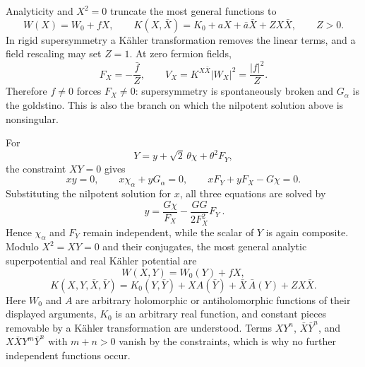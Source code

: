\begin{enumerate}
  Analyticity and \(X^2=0\) truncate the most general functions to
  \[
    W(X)=W_0+fX,
    \qquad
    K(X,\bar X)=K_0+aX+\bar a\bar X+Z X\bar X,
    \qquad Z>0.
  \]
  In rigid supersymmetry a K\"ahler transformation removes the linear terms,
  and a field rescaling may set \(Z=1\).  At zero fermion fields,
  \[
    F_X=-\frac{\bar f}{Z},
    \qquad
    V_X=K^{X\bar X}|W_X|^2=\frac{|f|^2}{Z}.
  \]
  Therefore \(f\ne0\) forces \(F_X\ne0\): supersymmetry is spontaneously
  broken and \(G_\alpha\) is the goldstino.  This is also the branch on which
  the nilpotent solution above is nonsingular.

  For
  \[
    Y=y+\sqrt2\,\theta\chi+\theta^2F_Y,
  \]
  the constraint \(XY=0\) gives
  \[
    xy=0,\qquad x\chi_\alpha+yG_\alpha=0,
    \qquad xF_Y+yF_X-G\chi=0.
  \]
  Substituting the nilpotent solution for \(x\), all three equations are
  solved by
  \[
    \boxed{\ y=\frac{G\chi}{F_X}
      -\frac{GG}{2F_X^2}F_Y\ }.
  \]
  Hence \(\chi_\alpha\) and \(F_Y\) remain independent, while the scalar of
  \(Y\) is again composite.  Modulo \(X^2=XY=0\) and their conjugates, the
  most general analytic superpotential and real K\"ahler potential are
  \[
    W(X,Y)=W_0(Y)+fX,
  \]
  \[
    K(X,Y,\bar X,\bar Y)
      =K_0(Y,\bar Y)+X A(\bar Y)+\bar X\,\bar A(Y)+Z X\bar X.
  \]
  Here \(W_0\) and \(A\) are arbitrary holomorphic or antiholomorphic
  functions of their displayed arguments, \(K_0\) is an arbitrary real
  function, and constant pieces removable by a K\"ahler transformation are
  understood.  Terms \(X Y^n\), \(\bar X\bar Y^n\), and
  \(X\bar X Y^m\bar Y^n\) with \(m+n>0\) vanish by the constraints, which is
  why no further independent functions occur.


\end{enumerate}
